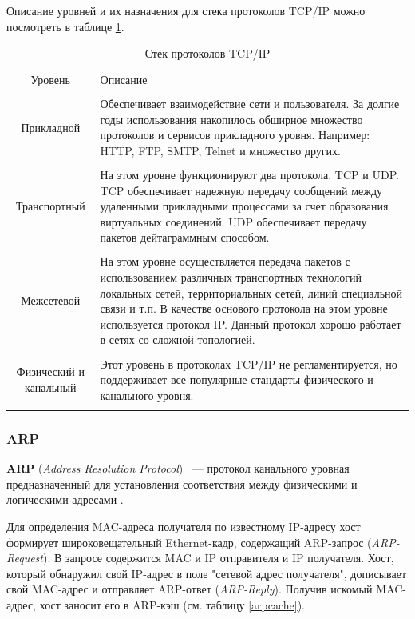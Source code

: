 Описание уровней и их назначения для стека протоколов TCP/IP можно посмотреть в таблице \ref{tcpiptable}.

\begin{table}[h!]
\caption{Стек протоколов TCP/IP}
\label{tcpiptable}
	\begin{tabular}{|c| >{\centering} m{100mm} <{\centering}|}
	\hline
	Уровень & Описание \\
	\tabularnewline
	\hline
	Прикладной & Обеспечивает взаимодействие сети и пользователя. За долгие годы использования накопилось обширное множество протоколов и сервисов прикладного уровня. Например: HTTP, FTP, SMTP, Telnet и множество других.\\
	\tabularnewline
	\hline
	Транспортный & На этом уровне функционируют два протокола. TCP и UDP. TCP обеспечивает надежную передачу сообщений между удаленными прикладными процессами за счет образования виртуальных соединений. UDP обеспечивает передачу пакетов дейтаграммным способом.\\
	\tabularnewline
	\hline
	Межсетевой & На этом уровне осуществляется передача пакетов с использованием различных транспортных технологий локальных сетей, территориальных сетей, линий специальной связи и т.п. В качестве основого протокола на этом уровне используется протокол IP. Данный протокол хорошо работает в сетях со сложной топологией.\\
	\tabularnewline
	\hline
	Физический и канальный & Этот уровень в протоколах TCP/IP не регламентируется, но поддерживает все популярные стандарты физического и канального уровня.\\
	\tabularnewline
	\hline
	\end{tabular}
\end{table}

\iffalse

\subsubsection{ARP}

\textbf{ARP} (\textit{Address Resolution Protocol}) ~--- протокол канального уровная предназначенный для установления соответствия между физическими и логическими адресами \cite{arp}.

Для определения MAC-адреса получателя по известному IP-адресу хост формирует широковещательный Ethernet-кадр, содержащий ARP-запрос (\textit{ARP-Request}). В запросе содержится MAC и IP отправителя и IP получателя. Хост, который обнаружил свой IP-адрес в поле "сетевой адрес получателя", дописывает свой MAC-адрес и отправляет ARP-ответ (\textit{ARP-Reply}). Получив искомый MAC-адрес, хост заносит его в ARP-кэш (см. таблицу \ref{arpcache}). 

